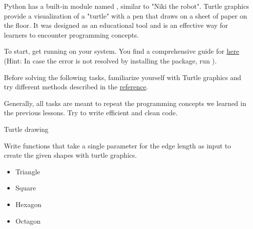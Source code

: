 \documentclass[twoside]{article}
\begin{document}
\maketitle


\vspace{10pt}

Python has a built-in module named , similar to "Niki the robot".
Turtle graphics provide a visualization of a "turtle" with a pen that draws on a sheet of paper on the floor.
It was designed as an educational tool and is an effective way for learners to encounter programming concepts.

\vspace{10pt}

To start, get  running on your system. You find a comprehensive guide for  \href{https://docs.python.org/3/library/turtle.html}{here}
(Hint: In case the  error is not resolved by installing the  package, run ).

\vspace{10pt}

Before solving the following tasks, familiarize yourself with Turtle graphics and try different methods described in the \href{https://docs.python.org/3/library/turtle.html}{reference}.

\vspace{10pt}

Generally, all tasks are meant to repeat the programming concepts we learned in the previous lessons. Try to write efficient and clean code.

\begin{task}{Turtle drawing}{}{}

Write functions that take a single parameter  for the edge length as input to create the given shapes with turtle graphics. 

\begin{itemize}
    \item Triangle
    \item Square
    \item Hexagon
    \item Octagon
\end{itemize}

\end{task}
\end{document}
